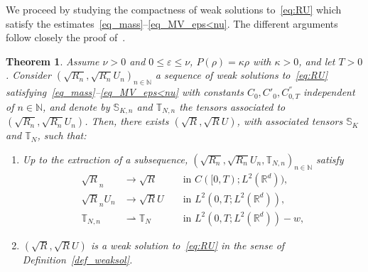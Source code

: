 \documentclass[10pt]{amsart}
\newtheorem{theo}{Theorem}[section]
\theoremstyle{definition}\newtheorem{defi}[theo]{Definition}\newtheorem{rema}[theo]{Remark}\newtheorem{exam}[theo]{Example}\newtheorem{exem}[theo]{Example}\newtheorem{nota}[theo]{Notation}
\newcommand*\<{\left\langle}
\renewcommand*\>{\right\rangle}
\renewcommand*\le{\leqslant}
\begin{document}
We proceed by studying the compactness of weak solutions to~\eqref{eq:RU} which satisfy the estimates~\eqref{eq_mass}--\eqref{eq_MV_eps<nu}. The different arguments follow closely the proof of~\cite[Theorem~2.1]{MelletVasseur}.


\begin{theo}\label{theo:compacite}
Assume $\nu >0$ and $0 \le \varepsilon \le \nu$, $P(\rho)=\kappa \rho$ with $\kappa >0$, and let $T>0$. Consider $(\sqrt{R_n}, \sqrt{R_n} U_n)_{n\in \mathbb N}$ a sequence of weak solutions to~\eqref{eq:RU} satisfying~\eqref{eq_mass}--\eqref{eq_MV_eps<nu} with constants $C_0,C'_0,C^{''}_{0,T}$ independent of $n \in \mathbb N$, and denote by $\mathbb S_{K,n}$ and $\mathbb T_{N,n}$ the tensors associated to $(\sqrt{R_n}, \sqrt{R_n} U_n)$. Then, there exists $(\sqrt{R},\sqrt{R}U)$, with associated tensors $\mathbb S_K$ and $\mathbb T_N$, such that:
\begin{enumerate}
\item \label{4.10.1} Up to the extraction of a subsequence, $(\sqrt{R_n},\sqrt{R_n} U_n,\mathbb T_{N,n})_{n\in \mathbb N}$ satisfy
\[
\begin{aligned}
\sqrt{R}_n &\to \sqrt{R} && \text{ in } C([0,T) ; L^2(\mathbb R^d)), \\
\sqrt{R}_n U_n &\to \sqrt{R}U &&\text{ in $L^2(0,T;L^2(\mathbb R^d)),$} \\
\mathbb T_{N,n} &\rightharpoonup \mathbb T_N && \text{ in $L^2(0,T;L^2(\mathbb R^d))-w$},
\end{aligned}
\]
\item \label{4.10.2} $(\sqrt{R},\sqrt{R} U)$ is a weak solution to~\eqref{eq:RU} in the sense of Definition~\ref{def_weaksol}.
\end{enumerate}
\end{theo}
\end{document}
